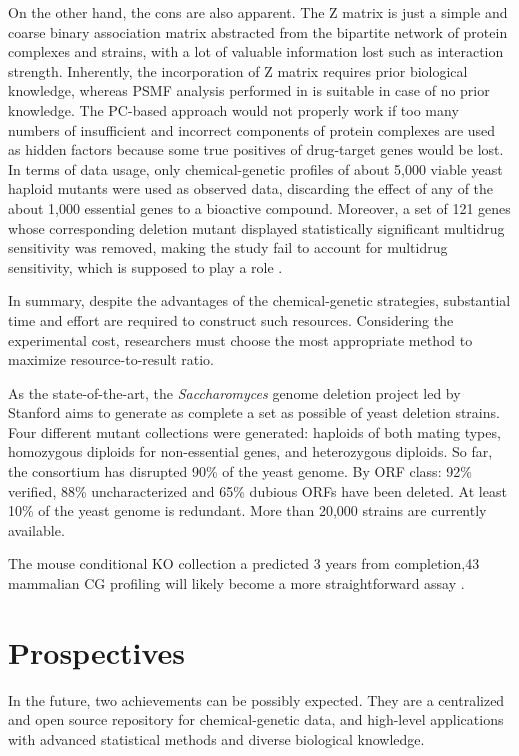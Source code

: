\documentclass[12pt,fullpage,singlespace]{article}
\begin{document}
On the other hand, the cons are also apparent. The Z matrix is just a simple and coarse binary association matrix abstracted from the bipartite network of protein complexes and strains, with a lot of valuable information lost such as interaction strength. Inherently, the incorporation of Z matrix requires prior biological knowledge, whereas PSMF analysis performed in \citep{1078} is suitable in case of no prior knowledge. The PC-based approach would not properly work if too many numbers of insufficient and incorrect components of protein complexes are used as hidden factors because some true positives of drug-target genes would be lost. In terms of data usage, only chemical-genetic profiles of about 5,000 viable yeast haploid mutants were used as observed data, discarding the effect of any of the about 1,000 essential genes to a bioactive compound. Moreover, a set of 121 genes whose corresponding deletion mutant displayed statistically significant multidrug sensitivity was removed, making the study fail to account for multidrug sensitivity, which is supposed to play a role \citep{1080}.

In summary, despite the advantages of the chemical-genetic strategies, substantial time and effort are required to construct such resources. Considering the experimental cost, researchers must choose the most appropriate method to maximize resource-to-result ratio.

As the state-of-the-art, the \textit{Saccharomyces} genome deletion project led by Stanford \citep{1107} aims to generate as complete a set as possible of yeast deletion strains. Four different mutant collections were generated: haploids of both mating types, homozygous diploids for non-essential genes, and heterozygous diploids. So far, the consortium has disrupted 90\% of the yeast genome. By ORF class: 92\% verified, 88\% uncharacterized and 65\% dubious ORFs have been deleted. At least 10\% of the yeast genome is redundant. More than 20,000 strains are currently available.

The mouse conditional KO collection a predicted 3 years from completion,43 mammalian CG profiling will likely become a more straightforward assay \citep{1082}.

\section{Prospectives}

In the future, two achievements can be possibly expected. They are a centralized and open source repository for chemical-genetic data, and high-level applications with advanced statistical methods and diverse biological knowledge.
\end{document}
